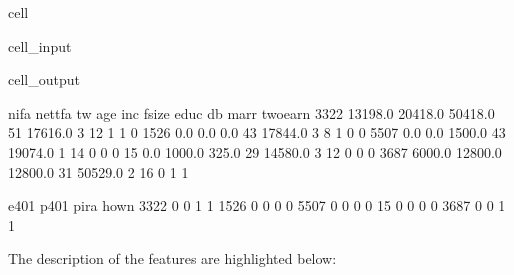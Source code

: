 \documentclass[letterpaper,10pt,english]{jupyterBook}
\begin{document}
\begin{sphinxuseclass}{cell}\begin{sphinxVerbatimInput}

\begin{sphinxuseclass}{cell_input}
\begin{sphinxVerbatim}[commandchars=\\\{\}]
  
\end{sphinxVerbatim}

\end{sphinxuseclass}\end{sphinxVerbatimInput}
\begin{sphinxVerbatimOutput}

\begin{sphinxuseclass}{cell_output}
\begin{sphinxVerbatim}[commandchars=\\\{\}]
         nifa  net\PYGZus{}tfa       tw  age      inc  fsize  educ  db  marr  twoearn  \PYGZbs{}
3322  13198.0  20418.0  50418.0   51  17616.0      3    12   1     1        0   
1526      0.0      0.0      0.0   43  17844.0      3     8   1     0        0   
5507      0.0      0.0   1500.0   43  19074.0      1    14   0     0        0   
15        0.0  \PYGZhy{}1000.0   \PYGZhy{}325.0   29  14580.0      3    12   0     0        0   
3687   6000.0  12800.0  12800.0   31  50529.0      2    16   0     1        1   

      e401  p401  pira  hown  
3322     0     0     1     1  
1526     0     0     0     0  
5507     0     0     0     0  
15       0     0     0     0  
3687     0     0     1     1  
\end{sphinxVerbatim}

\end{sphinxuseclass}\end{sphinxVerbatimOutput}

\end{sphinxuseclass}
\sphinxAtStartPar
The description of the features are highlighted below:
\end{document}
